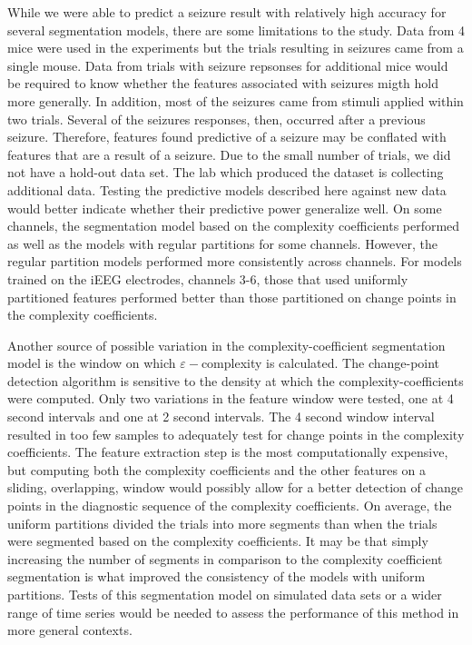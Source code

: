 While we were able to predict a seizure result 
with relatively high accuracy for several segmentation models,
there are some 
limitations to the study. Data from 4 mice  
were used in the experiments but the 
trials resulting in seizures came from a single mouse. 
Data from trials with seizure repsonses for additional 
mice would be 
required to know whether the features associated 
with seizures migth hold more generally. In addition, 
most of the seizures 
came from stimuli applied within two trials. 
Several of the seizures responses, then, 
occurred after a previous seizure. 
Therefore, features found predictive of a seizure may  
be conflated with features that are a result of a seizure. 
Due to the small number of trials, we did not 
have a hold-out data set. The lab which produced the 
dataset is collecting additional data.  
Testing the predictive models described here against 
new data would better indicate whether their predictive power 
generalize well. 
On some channels, the segmentation model based on the complexity coefficients performed as well as the models with regular partitions for some channels. However, the regular partition models performed more consistently across channels. For models trained on the iEEG electrodes, channels 3-6, those that used uniformly partitioned features performed better than those partitioned on change points in the complexity coefficients. 

Another source of possible variation in the complexity-coefficient segmentation model is the window on which $\varepsilon-$complexity is calculated. The change-point detection algorithm is sensitive to the density at which the complexity-coefficients were computed. Only two variations in the feature window were tested, one at 4 second intervals and one at 2 second intervals. The 4 second window interval resulted in too few samples to adequately test for change points in the 
complexity coefficients. The feature extraction step is the most computationally expensive, but computing both the complexity coefficients and the other features on a sliding, overlapping, window would possibly allow for a better detection of change points in the diagnostic sequence of the complexity coefficients. On average, the uniform partitions divided the trials into more segments than when the trials were
segmented based on the 
complexity coefficients. It may be that simply increasing the number 
of segments in comparison to the complexity coefficient segmentation
is what improved the consistency of the models with uniform 
partitions. 
Tests of this segmentation model on simulated data sets or a wider range of time series would be needed to assess the performance of this 
method in more general contexts.  


